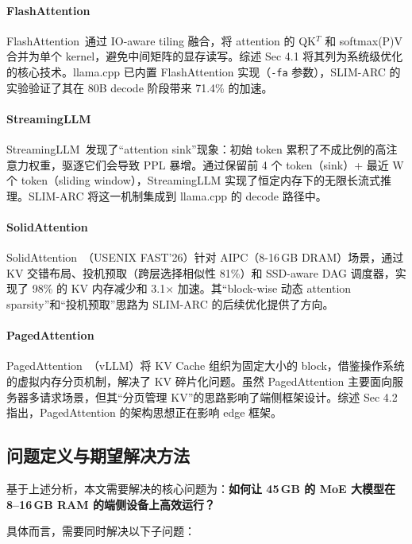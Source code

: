 \paragraph{FlashAttention}
FlashAttention~\cite{flashattention2022, flashattention2_2023}通过 IO-aware tiling 融合，将 attention 的 QK$^T$ 和 softmax(P)V 合并为单个 kernel，避免中间矩阵的显存读写。综述 Sec 4.1 将其列为系统级优化的核心技术。llama.cpp 已内置 FlashAttention 实现（\texttt{-fa} 参数），SLIM-ARC 的实验验证了其在 80B decode 阶段带来 71.4\% 的加速。

\paragraph{StreamingLLM}
StreamingLLM~\cite{streamingllm2024}发现了“attention sink”现象：初始 token 累积了不成比例的高注意力权重，驱逐它们会导致 PPL 暴增。通过保留前 4 个 token（sink）+ 最近 W 个 token（sliding window），StreamingLLM 实现了恒定内存下的无限长流式推理。SLIM-ARC 将这一机制集成到 llama.cpp 的 decode 路径中。

\paragraph{SolidAttention}
SolidAttention~\cite{solidattention2026}（USENIX FAST'26）针对 AIPC（8-16\,GB DRAM）场景，通过 KV 交错布局、投机预取（跨层选择相似性 81\%）和 SSD-aware DAG 调度器，实现了 98\% 的 KV 内存减少和 3.1$\times$ 加速。其“block-wise 动态 attention sparsity”和“投机预取”思路为 SLIM-ARC 的后续优化提供了方向。

\paragraph{PagedAttention}
PagedAttention~\cite{pagedattention2023}（vLLM）将 KV Cache 组织为固定大小的 block，借鉴操作系统的虚拟内存分页机制，解决了 KV 碎片化问题。虽然 PagedAttention 主要面向服务器多请求场景，但其“分页管理 KV”的思路影响了端侧框架设计。综述 Sec 4.2 指出，PagedAttention 的架构思想正在影响 edge 框架。

\subsection{问题定义与期望解决方法}

基于上述分析，本文需要解决的核心问题为：\textbf{如何让 45\,GB 的 MoE 大模型在 8--16\,GB RAM 的端侧设备上高效运行？}

具体而言，需要同时解决以下子问题：

